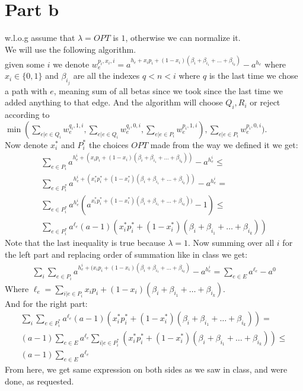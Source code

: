 \documentclass{article}
\begin{document}
\section{Part b}
w.l.o.g assume that $\lambda = OPT$ is $1$, otherwise we can normalize it.\\
We will use the following algorithm.\\
given some $i$ we denote $w^{p_i,x_i,i}_e=a^{h_e+x_ip_i+(1-x_i)(\beta_i+\beta_{i_1}+\dots+\beta_{i_k})}-a^{h_e}$ where $x_i\in\{0,1\}$ and $\beta_{i_j}$ are all the indexes $q< n< i$  where $q$ is the last time we chose a path with $e$, meaning sum of all betas since we took since the last time we added anything to that edge. And the algorithm will choose $Q_i,R_i$ or reject according to $\min(\sum_{e|e\in Q_i}w_e^{q_i,1,i}, \sum_{e|e\in Q_i}w_e^{q_i,0,i}, \sum_{e|e\in P_i}w_e^{p_i,1,i}), \sum_{e|e\in P_i}w_e^{p_i,0,i})$.\\
Now denote $x^*_i$ and $P^*_i$ the choices $OPT$ made from the way we defined it we get:
\begin{gather*}
    \sum_{e\in P_i} a^{h^i_e+(x_ip_i+(1-x_i)(\beta_i+\beta_{i_1}+\dots+\beta_{i_k}))} - a^{h^i_e} \leq \\
    \sum_{e\in P^*_i} a^{h^i_e+(x^*_ip^*_i+(1-x^*_i)(\beta_i+\beta_{i_1}+\dots+\beta_{i_k}))} - a^{h^i_e} =\\
    \sum_{e\in P^*_i} a^{h^i_e}(a^{x^*_ip^*_i+(1-x^*_i)(\beta_i+\beta_{i_1}+\dots+\beta_{i_k}))}-1) \leq\\
    \sum_{e\in P^*_i} a^{\ell_e}(a-1)(x^*_ip^*_i+(1-x^*_i)(\beta_i+\beta_{i_1}+\dots+\beta_{i_k}))
\end{gather*}
Note that the last inequality is true because $\lambda=1$.
Now summing over all $i$ for the left part and replacing order of summation like in class we get:
\begin{gather*}
    \sum_i\sum_{e\in P_i} a^{h^i_e+(x_ip_i+(1-x_i)(\beta_i+\beta_{i_1}+\dots+\beta_{i_k})} - a^{h^i_e}=\sum_{e\in E}a^{\ell_e} - a^0
\end{gather*}
Where $\ell_e=\sum_{i|e\in P_i}x_ip_i+(1-x_i)(\beta_i+\beta_{i_1}+\dots+\beta_{i_k})$.\\
And for the right part:
\begin{gather*}
    \sum_i\sum_{e\in P^*_i} a^{\ell_e}(a-1)(x^*_ip^*_i+(1-x^*_i)(\beta_i+\beta_{i_1}+\dots+\beta_{i_k})) =\\
    (a-1)\sum_{e\in E}a^{\ell_e}\sum_{i|e\in P^*_i} (x^*_ip^*_i+(1-x^*_i)(\beta_i+\beta_{i_1}+\dots+\beta_{i_k})) \leq\\
    (a-1)\sum_{e\in E}a^{\ell_e}
\end{gather*}
From here, we get same expression on both sides as we saw in class, and were done, as requested.
\end{document}
